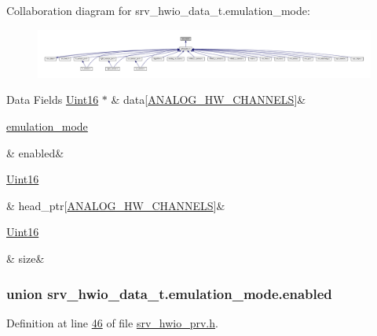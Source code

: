 Collaboration diagram for srv\+\_\+hwio\+\_\+data\+\_\+t.\+emulation\+\_\+mode\+:\nopagebreak
\begin{figure}[H]
\begin{center}
\leavevmode
\includegraphics[width=350pt]{dd/d08/a01682}
\end{center}
\end{figure}
\begin{DoxyFields}{Data Fields}
\hypertarget{a00034_ad1c1543a308506396b79ca30eeb395fd}{\hyperlink{a00072_a59a9f6be4562c327cbfb4f7e8e18f08b}{Uint16} $\ast$}\label{a00034_ad1c1543a308506396b79ca30eeb395fd}
&
data\mbox{[}\hyperlink{a00034_ab6ea71f43c4869429695d697be882efe}{A\+N\+A\+L\+O\+G\+\_\+\+H\+W\+\_\+\+C\+H\+A\+N\+N\+E\+L\+S}\mbox{]}&
\\
\hline

\hypertarget{a00034_aa10311459433adf322f2590a4987c423}{\hyperlink{a00034_d3/d00/a00785}{emulation\+\_\+mode}}\label{a00034_aa10311459433adf322f2590a4987c423}
&
enabled&
\\
\hline

\hypertarget{a00034_ac808eb4b79ad9afff0fb5c5da2c352f8}{\hyperlink{a00072_a59a9f6be4562c327cbfb4f7e8e18f08b}{Uint16}}\label{a00034_ac808eb4b79ad9afff0fb5c5da2c352f8}
&
head\+\_\+ptr\mbox{[}\hyperlink{a00034_ab6ea71f43c4869429695d697be882efe}{A\+N\+A\+L\+O\+G\+\_\+\+H\+W\+\_\+\+C\+H\+A\+N\+N\+E\+L\+S}\mbox{]}&
\\
\hline

\hypertarget{a00034_af7bd60b75b29d79b660a2859395c1a24}{\hyperlink{a00072_a59a9f6be4562c327cbfb4f7e8e18f08b}{Uint16}}\label{a00034_af7bd60b75b29d79b660a2859395c1a24}
&
size&
\\
\hline

\end{DoxyFields}
\label{d3/d00/a00785}
\hypertarget{a00034_d3/d00/a00785}{}
\subsubsection{union srv\+\_\+hwio\+\_\+data\+\_\+t.\+emulation\+\_\+mode.\+enabled}


Definition at line \hyperlink{a00034_source_l00046}{46} of file \hyperlink{a00034_source}{srv\+\_\+hwio\+\_\+prv.\+h}.



